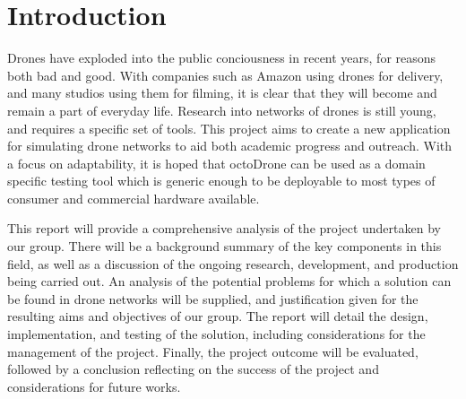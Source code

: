 \section{Introduction}
Drones have exploded into the public conciousness in recent years, for reasons both bad and good. With companies such as Amazon using drones for delivery, and many studios using them for filming, it is clear that they will become and remain a part of everyday life. Research into networks of drones is still young, and requires a specific set of tools. This project aims to create a new application for simulating drone networks to aid both academic progress and outreach. With a focus on adaptability, it is hoped that octoDrone can be used as a domain specific testing tool which is generic enough to be deployable to most types of consumer and commercial hardware available.

This report will provide a comprehensive analysis of the project undertaken by our group. There will be a background summary of the key components in this field, as well as a discussion of the ongoing research, development, and production being carried out. An analysis of the potential problems for which a solution can be found in drone networks will be supplied, and justification given for the resulting aims and objectives of our group. The report will detail the design, implementation, and testing of the solution, including considerations for the management of the project. Finally, the project outcome will be evaluated, followed by a conclusion reflecting on the success of the project and considerations for future works.